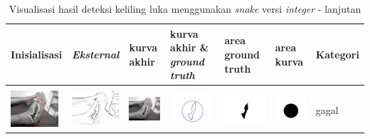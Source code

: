 \begin{table}[H]
	\centering
	\caption{Visualisasi hasil deteksi keliling luka menggunakan \emph{snake} versi \emph{integer} - lanjutan}
	\label{tabel_hasil_7}
	\begin{tabular}{|m{0.7in}|m{0.7in}|m{0.7in}|m{0.7in}|m{0.7in}|m{0.7in}|m{0.7in}|}
		\hline
		\textbf{Inisialisasi} & \textbf{\emph{Eksternal}} & \textbf{kurva akhir} & \textbf{kurva akhir \& \emph{ground truth}}& \textbf{area ground truth} & \textbf{area kurva} & \textbf{Kategori} \\
		\hline
		
		&  &  & & & &  \\
		\includegraphics[width=0.7in]{dataset/dataset_3/luka_merah/ready/8_integer_init.jpg}&
		\includegraphics[width=0.7in]{dataset/dataset_3/luka_merah/ready/8_integer_ext.jpg}&
		\includegraphics[width=0.7in]{dataset/dataset_3/luka_merah/ready/8_integer_result.jpg}&
		\includegraphics[width=0.7in]{dataset/dataset_3/luka_merah/ready/8_gt_r_integer.jpg}&
		\includegraphics[width=0.7in]{dataset/dataset_3/luka_merah/ready/8_r.jpg}&
		\includegraphics[width=0.7in]{dataset/dataset_3/luka_merah/ready/8_integer_r.jpg}&
		gagal\\
		\hline
		

\end{tabular}
\end{table}
